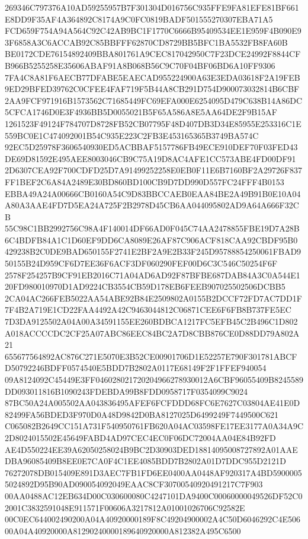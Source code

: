 \documentclass[UTF8,fontset=fandol,zihao=-4,a4paper]{ctexart}
\begin{document}
{{269346C797376A10AD59255957B7F301304D016756C935FFE9FA81EFE81BF661E8DD9F35AF4A364892C8174A9C0FC0819BADF501555270307EBA71A5
FCD659F754A94A564C92C42AB9BC1F1770C6666B95409534EE1E959F4B090E93F6858A3C6ACCAB92C85BBFFF62870CD8729BB5BFC1BA5532FB8FA60B
BE0172CDE76154892409BBA801761A9CEC817042950C7F23DCE24992F8844CFB966B5255258E35606ABAF91A8B068B56C9C70F04BF06BD6A10FF9306
7FA4C8A81F6AECB77DFABE5EAECAD955224900A63E3EDA03618F2A19FEB9ED29BFED39762C0CFEE4FAF719F5B44A8CB291D754D900073032814B6CBF
2AA9FCF971916B1573562C71685449FC69EFA000E6254095D479C638B14A86DC5CFCA1746D0E3F4936BB5D0055021B5F65A586A8E5AA64DE2F9B15AF
1261523F49124F784707D8728FB52CB07795F48D407DB3D34E85955E253316C1E559BC0E1C474092001B54C935E223C2FB3E453165365B3749BA574C
92EC5D25978F3606540930ED5ACBBAF5157786FB49ECE910DEF70F03FED43DE69D81592E495AEE8003046CB9C75A19D8AC4AFE1CC573ABE4FD00DF91
2D6307CEA92F700CDFD25D7A91499252258E0EB0F11E6B7160BF2A29726F837FF1BEF2C6A84A2489E30BD860BD100CB9D7DD990D557FC24FFF4B0153
EBBA49A24A00666CB0160A54C9D83BBCCAEB0EAA84BE2A49B91B0E10A04A80A3AAE4FD7D5EA24A725F2B2978D45CB6AA044095802AD9A64A666F32CB
55C98C1BB2992756C98A4F140014DF66AD0F045C74AA2478855FBE19D7A28B6C4BDFB84A1C1D60EF9DD6CA8089E26AF87C906ACF818CAA92CBDF95B0
429238B2C0DE9BAD650155F2741E2BF2A9E2B33F245D95788854250061FBAD950155B24D959CF6D7EE36F6ACF3DF060290FEF00D6C3C546C50254F6F
2578F254257B9CF91EB2016C71A04AD6AD92F87BFBE687DAB84A3C0A544E120FD980010970D1AD9224CB3554CB59D178EB6FEEB907025502506DCBB5
2CA04AC266FEB5022AA54ABE92B84E2509802A0155B2DCCF72FD7AC7DD1F7F4B2A719E1CD22FAA4492A42C9463044812C06871CEE6F6FB8B737FE5EC
7D3DA9125502A04A00A34591155EE260BDBCA1217FC5EFB45C2B496C1D802A018ACCCCDC2CF25A07ABC86EEC84BC2A7D8CBB876CE0D88DD79A802A21
655677564892AC876C271E5070E3B52CE00901706D1E52257E790F301781ABCFD50792246BDFF0574540E5BDD7B2802A0117E68149F2F1FFEF940054
09A8124092C45449E3FF046028021720204966278930012A6CBF96055409B8245589DD093011816B1090243FDEBDA99B8FDD0958717F0354099C9024
87BC50A24A005502AA043836495AFEF6FCFDDD68FC6E7627C03804AE41E0D82499FA56BDED3F970D0A48D9842D0BA8127025D6499249F7449500C621
C065082B2649CC151A731F540950761FB620A04AC03598FE17EE3177A0A34A9C2D8024015502E45649FABD4AD97CEC4EC0F06DC72004AA04E84B92FD
AE4D550224EE39A62050258024B9BC2D30903DED18814095008727892A01AAEDBA96085409B8EE0E7CA0F4C1EE4085BDD7B2802A01D7DDC955D2121D
76272078DB015409E891D3AEC7FB1FD6EE0400AA0448AF920317A4BD59000055024892D95B90AD090054092049EAAC8CF30700540920491217C7F903
00AA0488AC12EB634D00C030600080C4247101DA9400C00060000049526DF52C02001C3832591048E911571F00606A3217812A01001026706C92582E
00C0EC644002490200A04A40920000189F8C49204900002A4C50D6046292C4E50600A04A40920000A81290240000189640920000A812382A495C6500
}}
\end{document}

